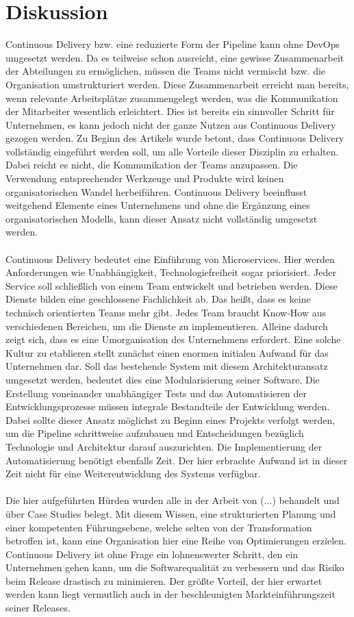 \section{Diskussion}
Continuous Delivery bzw. eine reduzierte Form der Pipeline kann ohne DevOps umgesetzt werden. Da es teilweise schon ausreicht, eine gewisse Zusammenarbeit der Abteilungen zu ermöglichen, müssen die Teams nicht vermischt bzw. die Organisation umstrukturiert werden. Diese Zusammenarbeit erreicht man bereits, wenn relevante Arbeitsplätze zusammengelegt werden, was die Kommunikation der Mitarbeiter wesentlich erleichtert. Dies ist bereits ein sinnvoller Schritt für Unternehmen, es kann jedoch nicht der ganze Nutzen aus Continuous Delivery gezogen werden. Zu Beginn des Artikels wurde betont, dass Continuous Delivery vollständig eingeführt werden soll, um alle Vorteile dieser Disziplin zu erhalten. Dabei reicht es nicht, die Kommunikation der Teams anzupassen. Die Verwendung entsprechender Werkzeuge und Produkte wird keinen organisatorischen Wandel herbeiführen. Continuous Delivery beeinflusst weitgehend Elemente eines Unternehmens und ohne die Ergänzung eines organisatorischen Modells, kann dieser Ansatz nicht vollständig umgesetzt werden.\\ \\
Continuous Delivery bedeutet eine Einführung von Microservices. Hier werden Anforderungen wie Unabhängigkeit, Technologiefreiheit sogar priorisiert. Jeder Service soll schließlich von einem Team entwickelt und betrieben werden. Diese Dienste bilden eine geschlossene Fachlichkeit ab. Das heißt, dass es keine technisch orientierten Teams mehr gibt. Jedes Team braucht Know-How aus verschiedenen Bereichen, um die Dienste zu implementieren. Alleine dadurch zeigt sich, dass es eine Umorganisation des Unternehmens erfordert. Eine solche Kultur zu etablieren stellt zunächst einen enormen initialen Aufwand für das Unternehmen dar. Soll das bestehende System mit diesem Architekturansatz umgesetzt werden, bedeutet dies eine Modularisierung seiner Software. Die Erstellung voneinander unabhängiger Tests und das Automatisieren der Entwicklungsprozesse müssen integrale Bestandteile der Entwicklung werden. Dabei sollte dieser Ansatz möglichst zu Beginn eines Projekts verfolgt werden, um die Pipeline schrittweise aufzubauen und Entscheidungen bezüglich Technologie und Architektur darauf auszurichten. Die Implementierung der Automatisierung benötigt ebenfalls Zeit. Der hier erbrachte Aufwand ist in dieser Zeit nicht für eine Weiterentwicklung des Systems verfügbar. \\ \\
Die hier aufgeführten Hürden wurden alle in der Arbeit von (...) behandelt und über Case Studies belegt. Mit diesem Wissen, eine strukturierten Planung und einer kompetenten Führungsebene, welche selten von der Transformation betroffen ist, kann eine Organisation hier eine Reihe von Optimierungen erzielen. Continuous Delivery ist ohne Frage ein lohnenswerter Schritt, den ein Unternehmen gehen kann, um die Softwarequalität zu verbessern und das Risiko beim Release drastisch zu minimieren. Der größte Vorteil, der hier erwartet werden kann liegt vermutlich auch in der beschleunigten Markteinführungszeit seiner Releases. 

